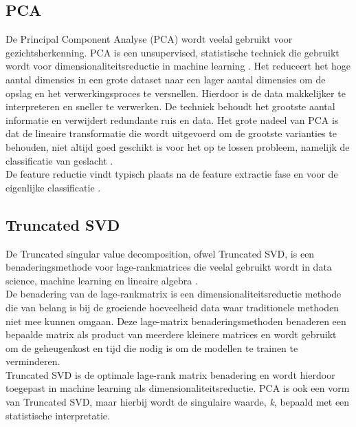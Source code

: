 \subsection{PCA} \label{sub:PCA}
De Principal Component Analyse (PCA) wordt veelal gebruikt voor gezichtsherkenning. PCA is een unsupervised, statistische techniek die gebruikt wordt voor dimensionaliteitsreductie in machine learning \autocite{SalihHasan2021}. Het reduceert het hoge aantal dimensies in een grote dataset naar een lager aantal dimensies om de opslag en het verwerkingsproces te versnellen. Hierdoor is de data makkelijker te interpreteren en sneller te verwerken. De techniek behoudt het grootste aantal informatie en verwijdert redundante ruis en data. Het grote nadeel van PCA is dat de lineaire transformatie die wordt uitgevoerd om de grootste varianties te behouden, niet altijd goed geschikt is voor het op te lossen probleem, namelijk de classificatie van geslacht \autocite{Wang2010}. \\
De feature reductie vindt typisch plaats na de feature extractie fase en voor de eigenlijke classificatie \autocite{Lakshmiprabha2016}.
\\
\subsection{Truncated SVD} \label{sub:truncatedsvd}
De Truncated singular value decomposition, ofwel Truncated SVD, is een benaderingsmethode voor lage-rankmatrices die veelal gebruikt wordt in data science, machine learning en lineaire algebra \autocite{Yeh2022}. \\
De benadering van de lage-rankmatrix is een dimensionaliteitsreductie methode die van belang is bij de groeiende hoeveelheid data waar traditionele methoden niet mee kunnen omgaan. Deze lage-matrix benaderingsmethoden benaderen een bepaalde matrix als product van meerdere kleinere matrices en wordt gebruikt om de geheugenkost en tijd die nodig is om de modellen te trainen te verminderen. \\
Truncated SVD is de optimale lage-rank matrix benadering en wordt hierdoor toegepast in machine learning als dimensionaliteitsreductie. PCA is ook een vorm van Truncated SVD, maar hierbij wordt de singulaire waarde, \textit{k}, bepaald met een statistische interpretatie.   

